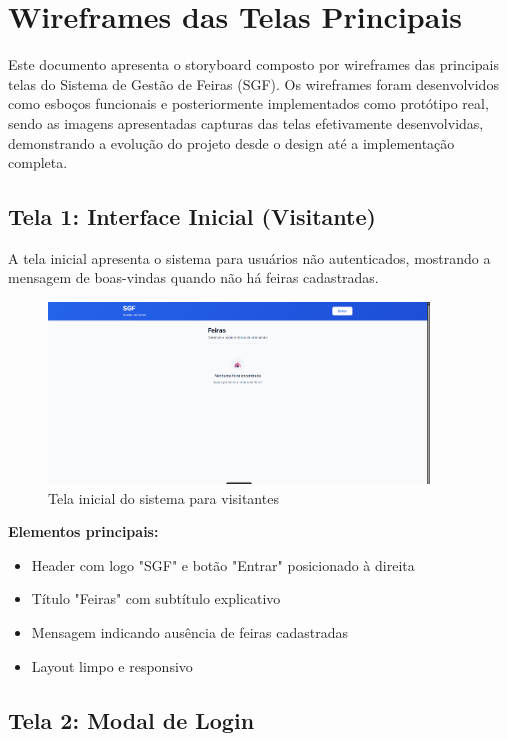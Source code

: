 \documentclass[12pt,a4paper]{article}
\begin{document}
\section{Wireframes das Telas Principais}

Este documento apresenta o storyboard composto por wireframes das principais telas do Sistema de Gestão de Feiras (SGF). Os wireframes foram desenvolvidos como esboços funcionais e posteriormente implementados como protótipo real, sendo as imagens apresentadas capturas das telas efetivamente desenvolvidas, demonstrando a evolução do projeto desde o design até a implementação completa.

\subsection{Tela 1: Interface Inicial (Visitante)}

A tela inicial apresenta o sistema para usuários não autenticados, mostrando a mensagem de boas-vindas quando não há feiras cadastradas.

\begin{figure}[H]
\centering
\includegraphics[width=0.9\textwidth]{wireframes/01_tela_inicial_visitante.png}
\caption{Tela inicial do sistema para visitantes}
\label{fig:tela_inicial}
\end{figure}

\textbf{Elementos principais:}
\begin{itemize}
    \item Header com logo "SGF" e botão "Entrar" posicionado à direita
    \item Título "Feiras" com subtítulo explicativo
    \item Mensagem indicando ausência de feiras cadastradas
    \item Layout limpo e responsivo
\end{itemize}

\subsection{Tela 2: Modal de Login}
\end{document}
